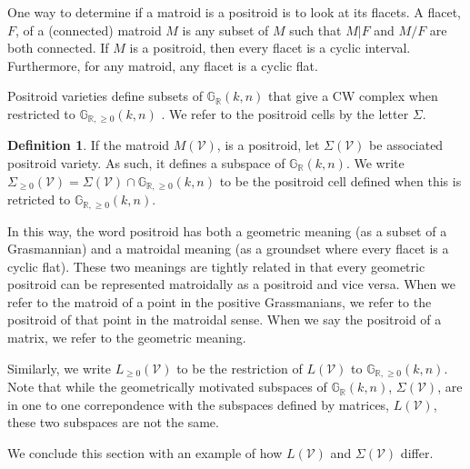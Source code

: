 \documentclass[11pt]{article}
\newcommand{\R}{\mathbb{R}}
\newcommand{\Gr}{\mathbb{G}_{\R, \geq 0}}
\newcommand{\Grall}{\mathbb{G}_{\R}}
\newcommand{\cV}{\mathcal{V}}
\newcommand{\Sigmapos}{\Sigma_{\geq 0}}
\newcommand{\Lpos}{L_{\geq 0}}
\theoremstyle{remark}
\theoremstyle{definition}
\newtheorem{dfn}[thm]{Definition}
\begin{document}
One way to determine if a matroid is a positroid is to look at its flacets. A flacet, $F$, of a (connected) matroid $M$ is any subset of $M$ such that $M|F$ and $M/F$ are both connected. If $M$ is a positroid, then every flacet is a cyclic interval. Furthermore, for any matroid, any flacet is a cyclic flat.

Positroid varieties define subsets of $\Grall(k,n)$ that give a CW complex when restricted to $\Gr(k,n)$ \cite[Chapter ]{Postnikov}. We refer to the positroid cells by the letter $\Sigma$.

\begin{dfn}If the matroid $M(\cV)$, is a positroid, let $\Sigma(\cV)$ be associated positroid variety. As such, it defines a subspace of $\Grall(k,n)$. We write $\Sigmapos(\cV) = \Sigma(\cV) \cap \Gr(k,n)$ to be the positroid cell defined when this is retricted to $\Gr(k,n)$. \end{dfn} 

In this way, the word positroid has both a geometric meaning (as a subset of a Grasmannian) and a matroidal meaning (as a groundset where every flacet is a cyclic flat). These two meanings are tightly related in that every geometric positroid can be represented matroidally as a positroid and vice versa. When we refer to the matroid of a point in the positive Grassmanians, we refer to the positroid of that point in the matroidal sense. When we say the positroid of a matrix, we refer to the geometric meaning.

Similarly, we write $\Lpos(\cV)$ to be the restriction of $L(\cV)$ to $\Gr(k,n)$. Note that while the geometrically motivated subspaces of $\Grall(k,n)$, $\Sigma(\cV)$, are in one to one correpondence with the subspaces defined by matrices, $L(\cV)$, these two subspaces are not the same.

We conclude this section with an example of how $L(\cV)$ and $\Sigma(\cV)$ differ.
\end{document}
